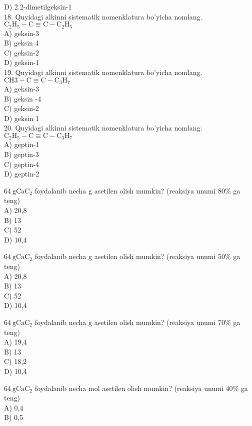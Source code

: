 D) 2.2-dimetilgeksin-1\\
18. Quyidagi alkinni sistematik nomenklatura bo'yicha nomlang. $\mathrm{C}_{2} \mathrm{H}_{5}-\mathrm{C} \equiv \mathrm{C}-\mathrm{C}_{2} \mathrm{H}_{5}$\\
A) geksin-3\\
B) geksin 4\\
C) geksin-2\\
D) geksin-1\\
19. Quyidagi alkinni sistematik nomenklatura bo'yicha nomlang. $\mathrm{CH} 3-\mathrm{C} \equiv \mathrm{C}-\mathrm{C}_{3} \mathrm{H}_{7}$\\
A) geksin-3\\
B) geksin -4\\
C) geksin-2\\
D) geksin 1\\
20. Quyidagi alkinni sistematik nomenklatura bo'yicha nomlang.\\
$\mathrm{C}_{2} \mathrm{H}_{5}-\mathrm{C} \equiv \mathrm{C}-\mathrm{C}_{3} \mathrm{H}_{7}$\\
A) geptin-1\\
B) geptin-3\\
C) geptin-4\\
D) geptin-2
  \item $64 \mathrm{~g} \mathrm{CaC}_{2}$ foydalanib necha g asetilen olish mumkin? (reaksiya unumi $80 \%$ ga teng)\\
A) 20,8\\
B) 13\\
C) 52\\
D) 10,4
  \item $64 \mathrm{~g} \mathrm{CaC}_{2}$ foydalanib necha g asetilen olish mumkin? (reaksiya unumi $50 \%$ ga teng)\\
A) 20,8\\
B) 13\\
C) 52\\
D) 10,4
  \item $64 \mathrm{~g} \mathrm{CaC}_{2}$ foydalanib necha g asetilen olish mumkin? (reaksiya unumi $70 \%$ ga teng)\\
A) 19,4\\
B) 13\\
C) 18,2\\
D) 10,4
  \item $64 \mathrm{~g} \mathrm{CaC}_{2}$ foydalanib necha mol asetilen olish mumkin? (reaksiya unumi $40 \%$ ga teng)\\
A) 0,4\\
B) 0,5\\
